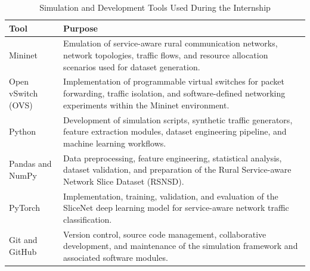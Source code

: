\documentclass[12pt,a4paper]{report}
\begin{document}
	\begin{table}[H]
		\centering
		\caption{Simulation and Development Tools Used During the Internship}
		\label{tab:simulation_tools}
		
		\begin{tabular}{|p{4cm}|p{9cm}|}
			\hline
			
			\textbf{Tool} &
			\textbf{Purpose}
			\\
			\hline
			
			Mininet &
			Emulation of service-aware rural communication networks, network topologies, traffic flows, and resource allocation scenarios used for dataset generation.
			\\
			\hline
			
			Open vSwitch (OVS) &
			Implementation of programmable virtual switches for packet forwarding, traffic isolation, and software-defined networking experiments within the Mininet environment.
			\\
			\hline
			
			Python &
			Development of simulation scripts, synthetic traffic generators, feature extraction modules, dataset engineering pipeline, and machine learning workflows.
			\\
			\hline
			
			Pandas and NumPy &
			Data preprocessing, feature engineering, statistical analysis, dataset validation, and preparation of the Rural Service-aware Network Slice Dataset (RSNSD).
			\\
			\hline
			
			PyTorch &
			Implementation, training, validation, and evaluation of the SliceNet deep learning model for service-aware network traffic classification.
			\\
			\hline
			
			Git and GitHub &
			Version control, source code management, collaborative development, and maintenance of the simulation framework and associated software modules.
			\\
			\hline
			
		\end{tabular}
		
	\end{table}
	
\end{document}
